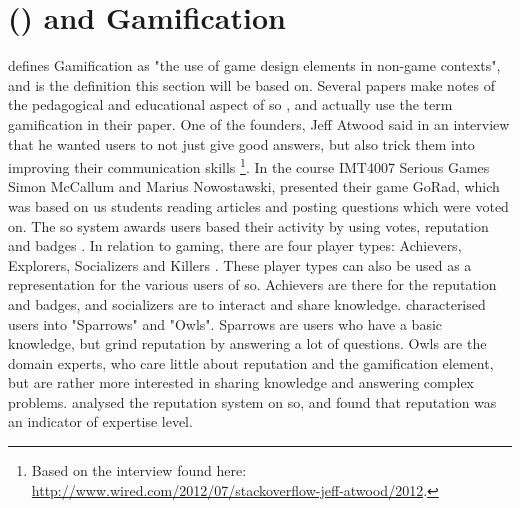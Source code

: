 \label{chap:chapter2}


\section[Stack Overflow and Gamification]{ () and Gamification}
\label{sec:gamification}
\citet{Deterding2011} defines Gamification as "the use of game design elements in non-game contexts", and is the definition this section will be based on. 
Several papers make notes of the pedagogical and educational aspect of \gls{so} \cite{Nasehi2012, Posnett2012, Yang2014}, and \cite{Nasehi2012, Yang2014} actually use the term gamification in their paper.
One of the founders, Jeff Atwood said in an interview that he wanted users to not just give good answers, but also trick them into improving their communication skills \cite{Posnett2012}\footnote{
	Based on the interview found here: \url{http://www.wired.com/2012/07/stackoverflow-jeff-atwood/2012}.
	}.
In the course IMT4007 Serious Games Simon McCallum and Marius Nowostawski, presented their game GoRad, which was based on us students reading articles and posting questions which were voted on. 
The \gls{so} system awards users based their activity by using votes, reputation and badges \cite{Sewak2010, Movshovitz-Attias2013, Treude2011, Stackoverflow.com2016, Stackoverflow.com2016c}.
In relation to gaming, there are four player types: Achievers, Explorers, Socializers and Killers \cite[p.~3]{Maan2013}.
\vspace{0.5em}\newline
These player types can also be used as a representation for the various users of \gls{so}. 
Achievers are there for the reputation and badges, and socializers are to interact and share knowledge. 
\citet{Yang2014} characterised users into "Sparrows" and "Owls". Sparrows are users who have a basic knowledge, but grind reputation by answering a lot of questions. 
Owls are the domain experts, who care little about reputation and the gamification element, but are rather more interested in sharing knowledge and answering complex problems. 
\citet{Movshovitz-Attias2013} analysed the reputation system on \gls{so}, and found that reputation was an indicator of expertise level.



